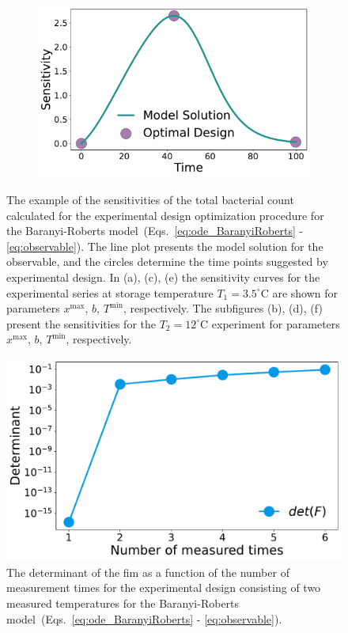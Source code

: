 \documentclass[graybox]{svmult}
\begin{document}
\begin{figure}[H]
\begin{subfigure}{.5\textwidth}
    \end{subfigure}
    \begin{subfigure}{.5\textwidth}
          \centering
          \includegraphics[scale=0.25]{Figures/Fig7f.pdf}
        \end{subfigure}
    \caption{The example of the sensitivities of the total bacterial count calculated for the experimental design optimization procedure for the Baranyi-Roberts model~(Eqs.~\ref{eq:ode_BaranyiRoberts} - \ref{eq:observable}).
    The line plot presents the model solution for the observable, and the circles determine the time points suggested by experimental design.
    In (a), (c), (e) the sensitivity curves for the experimental series at storage temperature $T_1=3.5^\circ$C are shown for parameters $x^\text{max}$, $b$, $T^\text{min}$, respectively.
    The subfigures (b), (d), (f) present the sensitivities for the $T_2=12^\circ$C experiment for parameters $x^\text{max}$, $b$, $T^\text{min}$, respectively.}
    \label{Fig7}
\end{figure}
%
%
\begin{figure}[H]
    \centering
    \includegraphics[scale=0.3]{Figures/Fig8.pdf}
    \caption{The determinant of the \ac{fim} as a function of the number of measurement times for the experimental design consisting of two measured temperatures for the Baranyi-Roberts model~(Eqs.~\ref{eq:ode_BaranyiRoberts} - \ref{eq:observable}).}
    \label{Fig8}
\end{figure}
\end{document}
